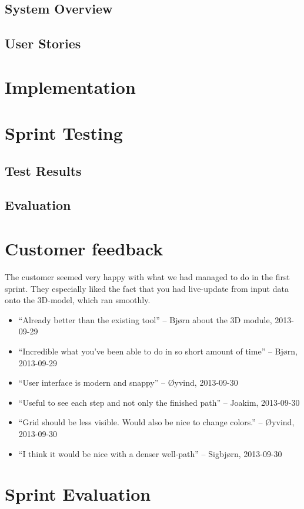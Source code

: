 \documentclass{report}
\begin{document}
\subsection{System Overview} \label{subsec:sys_overview1}
\subsection{User Stories} \label{subsec:user_stories1}
\section{Implementation} \label{sec:implementation1}
\section{Sprint Testing} \label{sec:sprint_testing1}
\subsection{Test Results} \label{subsec:test_results1}
\subsection{Evaluation} \label{subsec:evaluation1}
\section{Customer feedback} \label{sec:cust_feed1}
The customer seemed very happy with what we had managed to do in the first sprint. They especially liked the fact that you had live-update from input data onto the 3D-model, which ran smoothly.
\begin{itemize}
\item “Already better than the existing tool” – Bjørn about the 3D module, 2013-09-29
\item “Incredible what you’ve been able to do in so short amount of time” – Bjørn, 2013-09-29
\item “User interface is modern and snappy” – Øyvind, 2013-09-30
\item “Useful to see each step and not only the finished path”  – Joakim, 2013-09-30
\item “Grid should be less visible. Would also be nice to change colors.” – Øyvind, 2013-09-30 
\item “I think it would be nice with a denser well-path” – Sigbjørn, 2013-09-30
\end{itemize}
\section{Sprint Evaluation} \label{sec:sprint_eva1}
\end{document}
